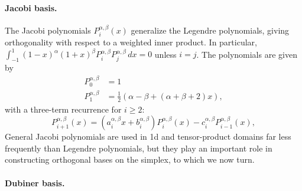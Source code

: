 \paragraph{Jacobi basis.}
The Jacobi polynomials $P^{\alpha,\beta}_i(x)$ generalize the Legendre
polynomials, giving orthogonality with respect to a weighted inner
product.  In particular, $\int_{-1}^1 (1-x)^\alpha (1+x)^\beta
P^{\alpha,\beta}_i P^{\alpha,\beta}_j \, dx = 0$ unless $i=j$.  The
polynomials are given by
\begin{equation}
\label{eq:firsttwojacobi}
\begin{split}
P_0^{\alpha,\beta} & = 1 \\
P_1^{\alpha,\beta} & 
= \frac{1}{2}\left( \alpha - \beta + \left( \alpha + \beta + 2 \right)
x \right),
\end{split}
\end{equation}
with a three-term recurrence for $i\geq2$:
\begin{equation}
\label{eq:recur}
P_{i+1}^{\alpha,\beta}(x) 
= (a^{\alpha,\beta}_i x + b^{\alpha,\beta}_i) P_i^{\alpha,\beta}(x) - c^{\alpha,\beta}_i P_{i-1}^{\alpha,\beta}(x),
\end{equation}
General Jacobi polynomials are used in 1d and tensor-product domains
far less frequently than Legendre polynomials, but they play an
important role in constructing orthogonal bases on the simplex, to
which we now turn.


\paragraph{Dubiner basis.}


